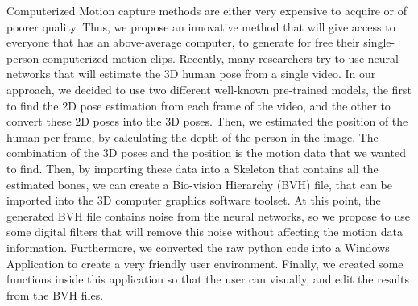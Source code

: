 Computerized Motion capture methods are either very expensive to acquire or of poorer quality. Thus, we propose an innovative method that will give access to everyone that has an above-average computer, to generate for free their single-person computerized motion clips.  Recently, many researchers try to use neural networks that will estimate the 3D human pose from a single video. In our approach, we decided to use two different well-known pre-trained models, the first to find the 2D pose estimation from each frame of the video, and the other to convert these 2D poses into the 3D poses. Then, we estimated the position of the human per frame, by calculating the depth of the person in the image. The combination of the 3D poses and the position is the motion data that we wanted to find. Then, by importing these data into a Skeleton that contains all the estimated bones, we can create a  Bio-vision Hierarchy (BVH) file, that can be imported into the 3D computer graphics software toolset. At this point, the generated BVH file contains noise from the neural networks, so we propose to use some digital filters that will remove this noise without affecting the motion data information. Furthermore, we converted the raw python code into a Windows Application to create a very friendly user environment. Finally, we created some functions inside this application so that the user can visually, and edit the results from the BVH files. 